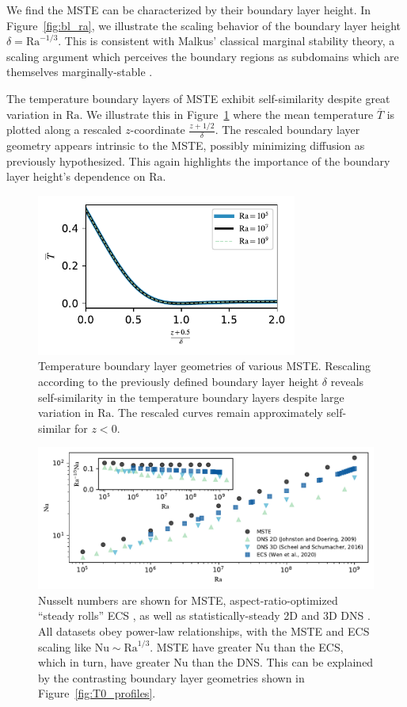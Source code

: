 \documentclass[reprint,amsmath,amssymb,aps,nofootinbib]{revtex4-1}
\newcommand\Ra{\mathrm{Ra}}
\newcommand\Nu{\mathrm{Nu}}
\begin{document}
We find the MSTE can be characterized by their boundary layer height.
In Figure~\ref{fig:bl_ra}, we illustrate the scaling behavior of the boundary layer height $\delta = \Ra^{-1/3}$. 
This is consistent with Malkus' classical marginal stability theory, a scaling argument which perceives the boundary regions as subdomains which are themselves marginally-stable \cite{Malkus_1954}.

The temperature boundary layers of MSTE exhibit self-similarity despite great variation in $\Ra$. 
We illustrate this in Figure~\ref{fig:b0_delta} where the mean temperature $\overline{T}$ is plotted along a rescaled $z$-coordinate $\frac{z + 1/2}{\delta}$.
The rescaled boundary layer geometry appears intrinsic to the MSTE, possibly minimizing diffusion as previously hypothesized.
This again highlights the importance of the boundary layer height's dependence on $\Ra$.

\begin{figure}
    \centering
    \includegraphics[width=3.375in]{b0_delta_solid.pdf}
    \caption{Temperature boundary layer geometries of various MSTE. 
    Rescaling according to the previously defined boundary layer height $\delta$ reveals self-similarity in the temperature boundary layers despite large variation in $\Ra$. 
    The rescaled curves remain approximately self-similar for $z < 0$.
    }
    \label{fig:b0_delta}
\end{figure}

\begin{figure}
    \centering
    \includegraphics[width=6.75in]{nu_ra.pdf}
    \caption{Nusselt numbers are shown for MSTE, aspect-ratio-optimized ``steady rolls'' ECS \cite{Wen}, as well as statistically-steady 2D and 3D DNS \cite{Johnston, Scheel_2016}.
    All datasets obey power-law relationships, with the MSTE and ECS scaling like $\Nu \sim\Ra^{1/3}$. 
    MSTE have greater $\Nu$ than the ECS, which in turn, have greater $\Nu$ than the DNS. 
    This can be explained by the contrasting boundary layer geometries shown in Figure~\ref{fig:T0_profiles}.}%
    \label{fig:nu_vs_ra}%
\end{figure}
\end{document}
